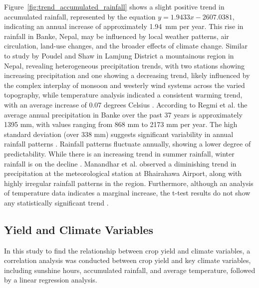 Figure~\ref{fig:trend_accumulated_rainfall} shows a slight positive trend in accumulated rainfall, represented by the equation $y=1.9433x - 2607.0381$, indicating an annual increase of approximately 1.94~mm per year. This rise in rainfall in Banke, Nepal, may be influenced by local weather patterns, air circulation, land-use changes, and the broader effects of climate change. Similar to study by Poudel and Shaw in Lamjung District a mountainous region in Nepal, revealing heterogeneous precipitation trends, with two stations showing increasing precipitation and one showing a decreasing trend, likely influenced by the complex interplay of monsoon and westerly wind systems across the varied topography, while temperature analysis indicated a consistent warming trend, with an average increase of 0.07 degrees Celsius  \citep{poudelRelationshipsClimateVariability2016}.
According to Regmi et al. the average annual precipitation in Banke over the past 37 years is approximately 1395 mm, with values ranging from 868 mm to 2173 mm per year. The high standard deviation (over 338 mm) suggests significant variability in annual rainfall patterns  \citep{regmiCropYieldResponse2019}.
Rainfall patterns fluctuate annually, showing a lower degree of predictability. While there is an increasing trend in summer rainfall, winter rainfall is on the decline \citep{maharjanEffectClimateVariables2013}.
Manandhar et al. observed a diminishing trend in precipitation at the meteorological station at Bhairahawa Airport, along with highly irregular rainfall patterns in the region. Furthermore, although an analysis of temperature data indicates a marginal increase, the t-test results do not show any statistically significant trend \citep{manandharAdaptingCroppingSystems2011}.

\subsection{Yield and Climate Variables}
In this study to find the relationship between crop yield and climate variables, a correlation analysis was conducted between crop yield and key climate variables, including sunshine hours, accumulated rainfall, and average temperature, followed by a linear regression analysis.

\begin{table}[htbp]
    \centering
    \caption{Correlation Table between Yield and Climate Variables}
\end{table}

